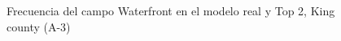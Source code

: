 \begin{figure}[H]
    \centering
    
    \caption{Frecuencia del campo Waterfront en el modelo real y Top 2, King county (A-3)}
    \label{frecuency-top2-waterfront}
\end{figure}